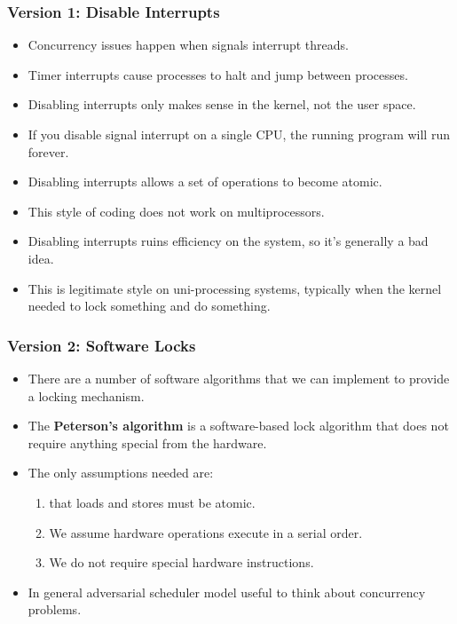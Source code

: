 \documentclass[]{article}
\begin{document}
\subsubsection{Version 1: Disable Interrupts}
\begin{itemize}
\item Concurrency issues happen when signals interrupt threads.
\item Timer interrupts cause processes to halt and jump between processes.
\item Disabling interrupts only makes sense in the kernel, not the user space.
\item If you disable signal interrupt on a single CPU, the running program will
run forever.
\item Disabling interrupts allows a set of operations to become atomic.
\item This style of coding does not work on multiprocessors.
\item Disabling interrupts ruins efficiency on the system, so it's generally a
bad idea.
\item This is legitimate style on uni-processing systems, typically when the
kernel needed to lock something and do something.
\end{itemize}

\subsubsection{Version 2: Software Locks}
\begin{itemize}
\item There are a number of software algorithms that we can implement to provide
a locking mechanism.
\item The \textbf{Peterson's algorithm} is a software-based lock algorithm that
does not require anything special from the hardware.
\item The only assumptions needed are:
\begin{enumerate}
\item that loads and stores must be atomic.
\item We assume hardware operations execute in a serial order.
\item We do not require special hardware instructions.
\end{enumerate}
\item In general adversarial scheduler model useful to think about concurrency
problems.
\end{itemize}
\end{document}
